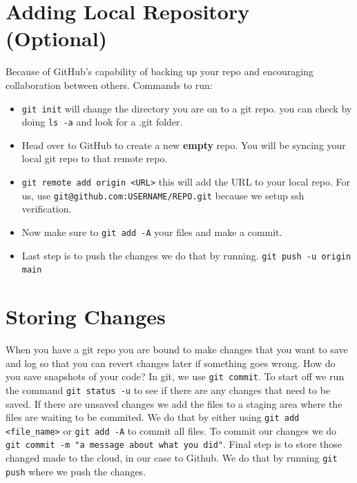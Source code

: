 \documentclass[12pt, a4paper]{article}
\begin{document}
\section{Adding Local Repository (Optional)}
Because of GitHub's capability of backing up your repo and encouraging collaboration between others. Commands to run:
\begin{itemize}
    \item \verb`git init` will change the directory you are on to a git repo. you can check by doing \verb`ls -a` and look for a .git folder.
    \item Head over to GitHub to create a new \textbf{empty} repo. You will be syncing your local git repo to that remote repo.
    \item \verb`git remote add origin <URL>` this will add the URL to your local repo. For us, use \verb`git@github.com:USERNAME/REPO.git` because we setup ssh verification.
    \item Now make sure to \verb`git add -A` your files and make a commit.
    \item Last step is to push the changes we do that by running. \verb`git push -u origin main`
\end{itemize}

\section{Storing Changes}

When you have a git repo you are bound to make changes that you want to save and log so that you can revert changes later if something goes wrong. How do you save snapshots of your code? In git, we use \texttt{git commit}. To start off we run the command \texttt{git status -u} to see if there are any changes that need to be saved. If there are unsaved changes we add the files to a staging area where the files are waiting to be commited. We do that by either using \texttt{git add <file\_name>} or \texttt{git add -A} to commit all files. To commit our changes we do \texttt{git commit -m "a message about what you did"}. Final step is to store those changed made to the cloud, in our case to Github. We do that by running \texttt{git push} where we push the changes.\\
\end{document}
